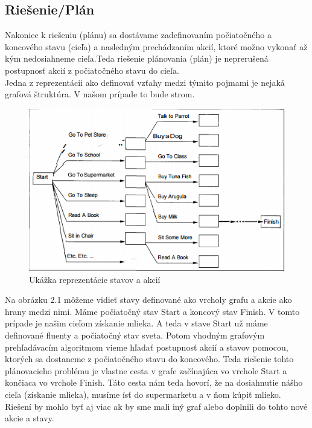 \subsection{Riešenie/Plán}
Nakoniec k riešeniu (plánu) sa dostávame zadefinovaním počiatočného a koncového stavu (cieľa) a nasledným prechádzaním akcií, ktoré možno vykonať až kým nedosiahneme cieľa.Teda riešenie plánovania (plán) je neprerušená postupnosť akcií z počiatočného stavu do cieľa.\\
Jedna z reprezentácii ako definovať vzťahy medzi týmito pojmami je nejaká grafová štruktúra. V našom prípade to bude strom.
\begin{figure}[ht] 
\begin{center}
\includegraphics[scale=1.0]{img/plan.png}
\caption{Ukážka reprezentácie stavov a akcií \cite{approach}}
\label{fig:ch21}
\end{center}
\end{figure}
Na obrázku 2.1 môžeme vidieť stavy definované ako vrcholy grafu a akcie ako hrany medzi nimi. Máme počiatočný stav Start a koncový stav Finish. V tomto prípade je našim cieľom získanie mlieka. A teda v stave Start už máme definované fluenty a počiatočný stav sveta. Potom vhodným grafovým prehľadávacím algoritmom vieme hľadať postupnosť akcií a stavov pomocou, ktorých sa dostaneme z počiatočného stavu do koncového. Teda riešenie tohto plánovacieho problému je vlastne cesta v grafe začínajúca vo vrchole Start a končiaca vo vrchole Finish. Táto cesta nám teda hovorí, že na dosiahnutie nášho cieľa (získanie mlieka), musíme ísť do supermarketu a v ňom kúpiť mlieko. Riešení by mohlo byť aj viac ak by sme mali iný graf alebo doplnili do tohto nové akcie a stavy.

